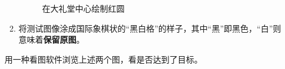\documentclass{article}
\numberwithin{figure}{section}
\numberwithin{table}{section}
\numberwithin{listing}{section}
\begin{document}
\begin{enumerate}
\begin{enumerate}
\begin{figure}[H]
                            \caption{在大礼堂中心绘制红圆}
                            \label{fig:red_circle}
                        \end{figure}

                    \item 将测试图像涂成国际象棋状的“黑白格”的样子，其中“黑”即黑色，“白”则意味着\textbf{保留原图}。
                \end{enumerate}

                用一种看图软件浏览上述两个图，看是否达到了目标。
        \end{enumerate}
    
\end{document}

